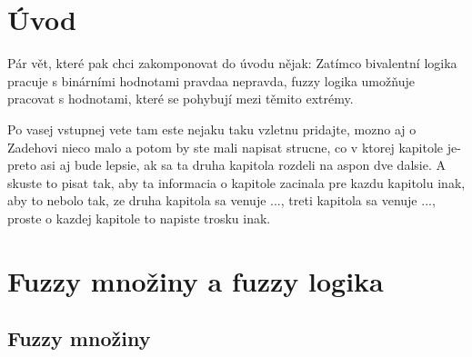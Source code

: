 


\newtheorem{definition}{Definice}
\newtheorem{remark}{Pozn\'amka}
\newtheorem{example}{Příklad}
\newtheorem{graph}{Obr\' azek}
\newtheorem{sentence}{Věta}
\newtheorem{tabul}{Tabulka}


\chapter{Úvod}
{\color{blue} Pár vět, které pak chci zakomponovat do \'uvodu nějak:
                \color{black} Zatímco bivalentní logika pracuje s binárními hodnotami \crqq \space pravda\crqq \space a \crqq \space nepravda\crqq \space , fuzzy logika umožňuje pracovat s hodnotami, které se pohybují mezi těmito extrémy.
}


{\color{red} Po vasej vstupnej vete tam este nejaku taku vzletnu pridajte, mozno aj o Zadehovi nieco malo a potom by ste mali napisat strucne, co v ktorej kapitole je-preto asi aj bude lepsie, ak sa ta druha kapitola rozdeli na aspon dve dalsie. A skuste to pisat tak, aby ta informacia o kapitole zacinala pre kazdu kapitolu inak, aby to nebolo tak, ze druha kapitola sa venuje ..., treti kapitola sa venuje ..., proste o kazdej kapitole to napiste trosku inak. }



\chapter {Fuzzy mno\v ziny a fuzzy logika}
\section{Fuzzy mno\v ziny} 


